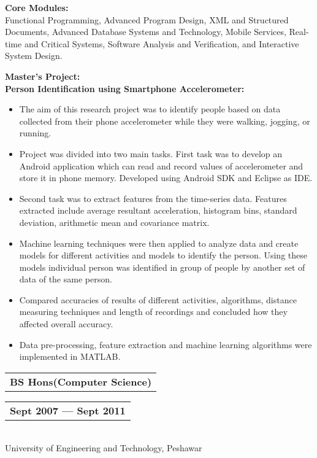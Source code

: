 \documentclass[a4paper]{article}
\begin{document}
                \begin{description}
                    \item \textbf{Core Modules:}\\
                        Functional Programming, Advanced Program Design, XML and Structured Documents, Advanced Database Systems and Technology, Mobile Services, Real-time and Critical Systems, Software Analysis and Verification, and Interactive System Design.
                    \item \textbf{Master's Project:}\\
                        \textbf{Person Identification using Smartphone Accelerometer:}
                        \begin{itemize}
                            \item  The aim of this research project was to identify people based on data collected from their phone accelerometer while they were walking, jogging, or running.
                            \item  Project was divided into two main tasks. First task was to develop an Android application which can read and record values of accelerometer and store it in phone memory. Developed using Android SDK and Eclipse as IDE.
                            \item  Second task was to extract features from the time-series data. Features extracted include average resultant acceleration, histogram bins, standard deviation, arithmetic mean and covariance matrix.
                            \item  Machine learning techniques were then applied to analyze data and create models for different activities and models to identify the person. Using these models individual person was identified in group of people by another set of data of the same person.
                            \item  Compared accuracies of results of different activities, algorithms, distance measuring techniques and length of recordings and concluded how they affected overall accuracy.
                            \item  Data pre-processing, feature extraction and machine learning algorithms were implemented in MATLAB.
                        \end{itemize}
                \end{description}
            
                \noindent\begin{tabular}[t]{@{}l}
                    \textbf{BS Hons(Computer Science)}
                \end{tabular}
                \hfill
                \begin{tabular}[t]{l@{}}
                   \textbf{Sept 2007 --- Sept 2011}
                \end{tabular}\\
                University of Engineering and Technology, Peshawar
            
\end{document}
